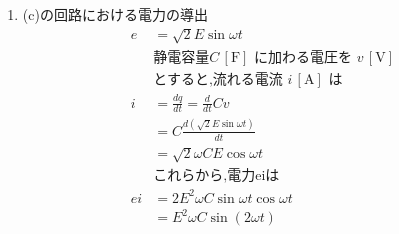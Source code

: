 \documentclass[twocolumn]{article}
\begin{document}
\begin{enumerate}
  \item (c)の回路における電力の導出
    \begin{align*}
    e &=\sqrt{2}E\sin\omega t\\
    &\text{静電容量} C\,[\text{F}] \text{ に加わる電圧を } v\,[\text{V}] \\
    &\text{とすると,流れる電流 } i\,[\text{A}] \text{ は} \\
    i   &= \frac{dq}{dt} = \frac{d}{dt}Cv \\
        &= C \frac{d \left(\sqrt{2}E\sin \omega t\right)}{dt} \\
        &= \sqrt{2}\omega CE\cos\omega t\\
    &\text{これらから,電力eiは}\\
    ei &= 2E^2 \omega C \sin\omega t \cos \omega t \\ 
    &= E^2 \omega C \sin \left(2 \omega t\right)\\
    \end{align*}


\end{enumerate}
\end{document}
